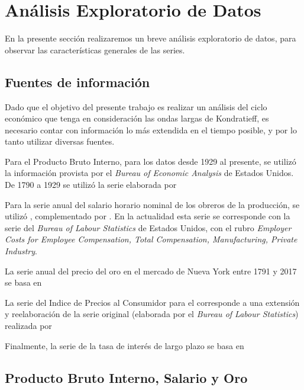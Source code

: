 \documentclass[a4paper]{article}
\begin{document}
\section{Análisis Exploratorio de Datos}
En la presente sección realizaremos un breve análisis exploratorio de datos, para observar las características generales de las series.


\subsection{Fuentes de información}

Dado que el objetivo del presente trabajo es realizar un análisis del ciclo económico que tenga en consideración las ondas largas de Kondratieff, es necesario contar con información lo más extendida en el tiempo posible, y por lo tanto utilizar diversas fuentes. 

Para el Producto Bruto Interno, para los datos desde 1929 al presente, se utilizó la información provista por el \textit{Bureau of Economic Analysis} de Estados Unidos. De 1790 a 1929 se utilizó la serie elaborada por \cite{johnston2018us}

Para la serie anual del salario horario nominal de los obreros de la producción, se utilizó \citep{officer2009two}, complementado por \citep{Roesch2018}. En la actualidad esta serie se corresponde con la serie del \textit{Bureau of Labour Statistics} de Estados Unidos, con el rubro \textit{Employer Costs for Employee Compensation, Total Compensation, Manufacturing, Private Industry}.

La serie anual del precio del oro en el mercado de Nueva York entre 1791 y 2017 se basa en \cite{officer2018gold}

La serie del Indice de Precios al Consumidor para el corresponde a una extensión y reelaboración de la serie original (elaborada por el \textit{Bureau of Labour Statistics}) realizada por \cite{officer2018cpi}

Finalmente, la serie de la tasa de interés de largo plazo se basa en \cite{officer2018ir}

\subsection{Producto Bruto Interno, Salario y Oro}

\end{document}
